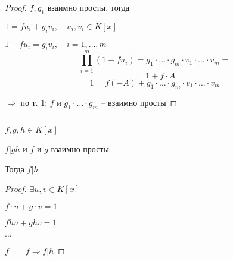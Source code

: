     \begin{proof}
        $f, g_1$ взаимно просты, тогда
        \par $1 = f u_i + g_i v_i, \quad u_i, v_i \in K[x]$
        \par $1 - f u_i = g_i v_i, \quad i = 1, \dots, m$
        \[
            \prod_{i=1}^m (1 - f u_i) = g_1 \cdot \ldots \cdot g_m \cdot v_1 \cdot \ldots \cdot v_m =
        \]
        \[
            = 1 + f \cdot A %
        \]
        \[
            1 = f (-A) + g_1 \cdot \ldots \cdot g_m \cdot v_1 \cdot \ldots \cdot v_m
        \]
        \par $\Rightarrow$ по т. 1: $f$ и $g_1 \cdot \ldots \cdot g_m$ -- взаимно просты
    \end{proof}

    \begin{theorem}
        $ $
        \par \quad $f, g, h \in K[x]$
        \par \quad $f | gh$ и $f$ и $g$ взаимно просты
        \par \quad Тогда $f | h$
    \end{theorem}

    \begin{proof}
        $\exists u, v \in K[x]$
        \par \quad $f \cdot u + g \cdot v = 1$
        \par \quad $fhu + ghv = 1$
        \par \quad $\dots$
        \par \quad $f \quad \quad f \Rightarrow f | h$  %
    \end{proof}

